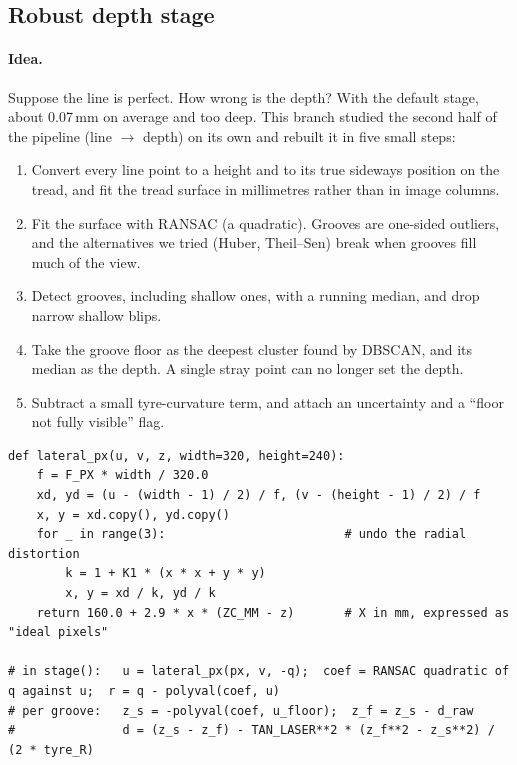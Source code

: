 
\subsection{Robust depth stage}\label{sec:depth}

\paragraph{Idea.} Suppose the line is perfect. How wrong is the depth? With the default stage, about 0.07\,mm on
average and too deep. This branch studied the second half of the pipeline (line $\rightarrow$ depth) on its own and
rebuilt it in five small steps:
\begin{enumerate}
\item Convert every line point to a height and to its true sideways position on the tread, and fit the tread surface
      in millimetres rather than in image columns.
\item Fit the surface with RANSAC (a quadratic). Grooves are one-sided outliers, and the alternatives we tried
      (Huber, Theil--Sen) break when grooves fill much of the view.
\item Detect grooves, including shallow ones, with a running median, and drop narrow shallow blips.
\item Take the groove floor as the deepest cluster found by DBSCAN, and its median as the depth. A single stray
      point can no longer set the depth.
\item Subtract a small tyre-curvature term, and attach an uncertainty and a ``floor not fully visible'' flag.
\end{enumerate}

\begin{lstlisting}[caption={Step 1 (\texttt{algos/robust\_depth.py}): undo lens distortion and express each point's sideways position in mm before fitting the tread surface.}]
def lateral_px(u, v, z, width=320, height=240):
    f = F_PX * width / 320.0
    xd, yd = (u - (width - 1) / 2) / f, (v - (height - 1) / 2) / f
    x, y = xd.copy(), yd.copy()
    for _ in range(3):                         # undo the radial distortion
        k = 1 + K1 * (x * x + y * y)
        x, y = xd / k, yd / k
    return 160.0 + 2.9 * x * (ZC_MM - z)       # X in mm, expressed as "ideal pixels"

# in stage():   u = lateral_px(px, v, -q);  coef = RANSAC quadratic of q against u;  r = q - polyval(coef, u)
# per groove:   z_s = -polyval(coef, u_floor);  z_f = z_s - d_raw
#               d = (z_s - z_f) - TAN_LASER**2 * (z_f**2 - z_s**2) / (2 * tyre_R)
\end{lstlisting}

